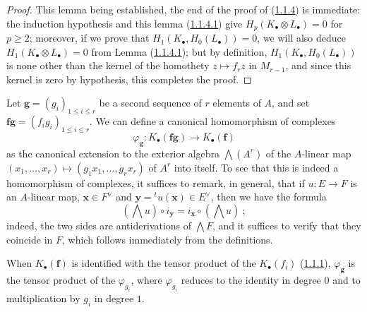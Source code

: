 \begin{proof}
This lemma being established, the end of the proof of
(\hyperref[III.1.1.4]{1.1.4}) is immediate: the induction hypothesis and
this lemma (\hyperref[III.1.1.4.1]{1.1.4.1}) give
$H_p(K_\bullet\otimes L_\bullet)=0$ for $p\geq2$; moreover, if we prove that
$H_1(K_\bullet,H_0(L_\bullet))=0$, we will also deduce
$H_1(K_\bullet\otimes L_\bullet)=0$ from Lemma
(\hyperref[III.1.1.4.1]{1.1.4.1}); but by definition,
$H_1(K_\bullet,H_0(L_\bullet))$ is none other than the kernel of the
homothety $z\mapsto f_rz$ in $M_{r-1}$, and since this kernel is zero by
hypothesis, this completes the proof.
\end{proof}

\begin{env}[1.1.5]
\label{III.1.1.5}
Let $\mathbf g=(g_i)_{1\leq i\leq r}$ be a second sequence of $r$ elements of
$A$, and set $\mathbf f\mathbf g=(f_ig_i)_{1\leq i\leq r}$. We can define
a canonical homomorphism of complexes
\begin{equation}
\label{III.1.1.5.1}
\tag{1.1.5.1}
\varphi_{\mathbf g}:K_\bullet(\mathbf f\mathbf g)\longrightarrow
K_\bullet(\mathbf f)
\end{equation}
as the canonical extension to the exterior algebra $\bigwedge(A^r)$ of
the $A$-linear map
$(x_1,\ldots,x_r)\mapsto(g_1x_1,\ldots,g_rx_r)$ of $A^r$ into itself. To
see that this is indeed a homomorphism of complexes, it suffices to remark,
in general, that if $u:E\to F$ is an $A$-linear map,
$\mathbf x\in F^\vee$ and $\mathbf y={}^tu(\mathbf x)\in E^\vee$, then we have
the formula
\begin{equation}
\label{III.1.1.5.2}
\tag{1.1.5.2}
(\bigwedge u)\circ i_{\mathbf y}=i_{\mathbf x}\circ(\bigwedge u)~;
\end{equation}
indeed, the two sides are antiderivations of $\bigwedge F$, and it
suffices to verify that they coincide in $F$, which follows immediately from
the definitions.

When $K_\bullet(\mathbf f)$ is identified with the tensor product of the
$K_\bullet(f_i)$ (\hyperref[III.1.1.1]{1.1.1}), $\varphi_{\mathbf g}$ is
the tensor product of the $\varphi_{g_i}$, where $\varphi_{g_i}$ reduces to
the identity in degree $0$ and to multiplication by $g_i$ in degree $1$.
\end{env}

